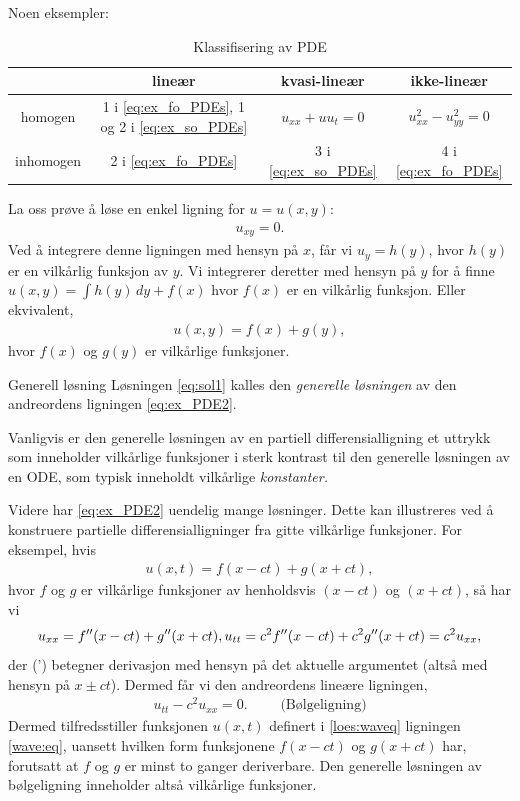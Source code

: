Noen eksempler:
\begin{table}[ht]
\centering
\begin{tabular}{|c|c|c|c|}
\hline
       & lineær  & kvasi-lineær & ikke-lineær \\
\hline
homogen  &  1 i \eqref{eq:ex_fo_PDEs}, 1 og 2 i \eqref{eq:ex_so_PDEs} & $u_{xx}+uu_t =0$ & $u_{xx}^2-u_{yy}^2=0$\\
\hline
inhomogen  & 2 i \eqref{eq:ex_fo_PDEs} & 3 i \eqref{eq:ex_so_PDEs}  & 4 i \eqref{eq:ex_fo_PDEs}\\
\hline
\end{tabular}
\caption{Klassifisering av PDE}
\label{tab:example}
\end{table}

La oss prøve å løse en enkel ligning for \( u = u(x, y) \):
\begin{align}\label{eq:ex_PDE2}
u_{xy} = 0. 
\end{align}
Ved å integrere denne ligningen med hensyn på \( x \), får vi $u_y = h(y)$, hvor \( h(y) \) er en vilkårlig funksjon av \( y \). Vi integrerer deretter med hensyn på \( y \) for å finne
$u(x, y) = \int h(y)\,dy + f(x)$ 
hvor \( f(x) \) er en vilkårlig funksjon. Eller ekvivalent,
\begin{align}\label{eq:sol1}
u(x, y) = f(x) + g(y),
\end{align}
hvor \( f(x) \) og \( g(y) \) er vilkårlige funksjoner.

\begin{defn}{Generell løsning}
Løsningen \eqref{eq:sol1} kalles den \emph{generelle løsningen} av den andreordens ligningen \eqref{eq:ex_PDE2}.
\end{defn}
Vanligvis er den generelle løsningen av en partiell differensialligning et uttrykk som inneholder vilkårlige funksjoner i sterk kontrast til den generelle løsningen av en ODE, som typisk inneholdt vilkårlige \textit{konstanter.}

Videre har \eqref{eq:ex_PDE2} uendelig mange løsninger. Dette kan illustreres ved å konstruere partielle differensialligninger fra gitte vilkårlige funksjoner. For eksempel, hvis
\begin{align}\label{loes:waveq}
u(x, t) = f(x - ct) + g(x + ct),
\end{align}
hvor \( f \) og \( g \) er vilkårlige funksjoner av henholdsvis \( (x - ct) \) og \( (x + ct) \), så har vi
\[
u_{xx} = f''(x - ct) + g''(x + ct), \\
u_{tt} = c^2 f''(x - ct) + c^2 g''(x + ct) = c^2 u_{xx},
\]
der (') betegner derivasjon med hensyn på det aktuelle argumentet (altså med hensyn på $x\pm ct$). Dermed får vi den andreordens lineære ligningen, 
\begin{align}\label{wave:eq}
u_{tt} - c^2 u_{xx} = 0. \qquad\text{  (Bølgeligning)}
\end{align}
Dermed tilfredsstiller funksjonen \( u(x, t) \) definert i \eqref{loes:waveq} ligningen \eqref{wave:eq}, uansett hvilken form funksjonene \( f(x - ct) \) og \( g(x + ct) \) har, forutsatt at \( f \) og \( g \) er minst to ganger deriverbare. Den generelle løsningen av bølgeligning inneholder altså vilkårlige funksjoner.

